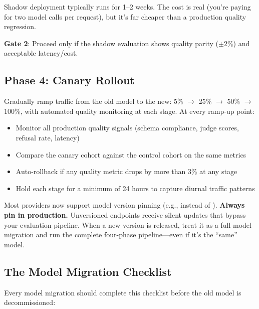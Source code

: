 Shadow deployment typically runs for 1--2 weeks. The cost is real (you're paying for two model calls per request), but it's far cheaper than a production quality regression.

\textbf{Gate 2}: Proceed only if the shadow evaluation shows quality parity ($\pm 2\%$) and acceptable latency/cost.

\subsection{Phase 4: Canary Rollout}

Gradually ramp traffic from the old model to the new: 5\% $\to$ 25\% $\to$ 50\% $\to$ 100\%, with automated quality monitoring at each stage. At every ramp-up point:

\begin{itemize}[leftmargin=*]
    \item Monitor all production quality signals (schema compliance, judge scores, refusal rate, latency)
    \item Compare the canary cohort against the control cohort on the same metrics
    \item Auto-rollback if any quality metric drops by more than 3\% at any stage
    \item Hold each stage for a minimum of 24 hours to capture diurnal traffic patterns
\end{itemize}

\begin{tipbox}
Most providers now support model version pinning (e.g.,  instead of ). \textbf{Always pin in production.} Unversioned endpoints receive silent updates that bypass your evaluation pipeline. When a new version is released, treat it as a full model migration and run the complete four-phase pipeline---even if it's the ``same'' model.
\end{tipbox}

\subsection{The Model Migration Checklist}

Every model migration should complete this checklist before the old model is decommissioned:

